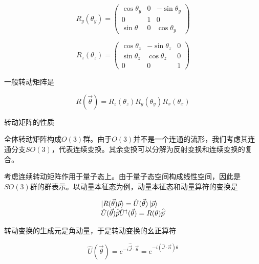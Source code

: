 \begin{equation}
    R_y(\theta_y)=\left(\begin{matrix}
        \cos\theta_y & 0 & -\sin\theta_y \\
        0 & 1 & 0 \\
        \sin\theta & 0 & \cos\theta_y
    \end{matrix}\right)
\end{equation}

\begin{equation}
    R_z(\theta_z)=\left(\begin{matrix}
        \cos\theta_z & -\sin\theta_z & 0 \\
        \sin\theta_z & \cos\theta_z & 0 \\
        0 & 0 & 1
    \end{matrix}\right)
\end{equation}

一般转动矩阵是

\begin{equation}
    R(\vec{\theta})=R_z(\theta_z)R_y(\theta_y)R_x(\theta_x)
\end{equation}

转动矩阵的性质





全体转动矩阵构成$O(3)$群。由于$O(3)$并不是一个连通的流形，我们考虑其连通分支$SO(3)$，代表连续变换。其余变换可以分解为反射变换和连续变换的复合。

考虑连续转动矩阵作用于量子态上。由于量子态空间构成线性空间，因此是$SO(3)$群的群表示。以动量本征态为例，动量本征态和动量算符的变换是

\begin{equation}
    \begin{array}{lr}
        \ket{R(\vec{\theta})\vec{p}}=\hat{U}(\vec{\theta})\ket{\vec{p}} \\
        \hat{U}(\vec{\theta})\hat{\vec{p}}\hat{U}^\dagger(\vec{\theta})=R(\theta)\hat{\vec{p}}
    \end{array}
\end{equation}

转动变换的生成元是角动量，于是转动变换的幺正算符

\begin{equation}
    \hat{U}(\vec{\theta})=e^{-i\hat{\vec{J}}\cdot\vec{\theta}}=e^{-i(\hat{J}\cdot\vec{n})\theta}
\end{equation}